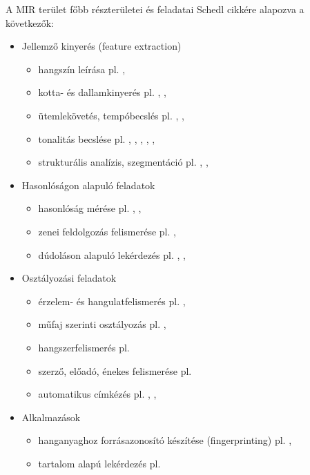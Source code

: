 A MIR terület főbb részterületei és feladatai Schedl \cite{Schedl2014} cikkére alapozva a következők:

\begin{itemize}
\item Jellemző kinyerés (feature extraction)
	\begin{itemize}
	\item hangszín leírása pl. \cite{hangszin1}, \cite{hangszin2}
	\item kotta- és dallamkinyerés pl. \cite{kotta1}, \cite{kotta2}, \cite{kotta3}
	\item ütemlekövetés, tempóbecslés pl. \cite{tempo1}, \cite{tempo2}, \cite{tempo3}
	\item tonalitás becslése pl. \cite{tonality1}, \cite{tonality2}, \cite{tonality3}, \cite{tonality4}, \cite{tonality5}, \cite{tonality6}
	\item strukturális analízis, szegmentáció pl. \cite{structural1}, \cite{structural2}, \cite{structural3}
	\end{itemize}
\item Hasonlóságon alapuló feladatok
	\begin{itemize}
	\item hasonlóság mérése pl. \cite{similarity1}, \cite{similarity2}, \cite{similarity3}
	\item zenei feldolgozás felismerése pl. \cite{cover1}, \cite{cover2}
	\item dúdoláson alapuló lekérdezés pl. \cite{humming1}, \cite{humming2}, \cite{humming3}
	\end{itemize}
\item Osztályozási feladatok
	\begin{itemize}
	\item érzelem- és hangulatfelismerés pl. \cite{mood1}, \cite{mood2}
	\item műfaj szerinti osztályozás pl. \cite{genre1}, \cite{genre2}
	\item hangszerfelismerés pl. \cite{instrument1}
	\item szerző, előadó, énekes felismerése pl. \cite{singer1}
	\item automatikus címkézés pl. \cite{tagging1}, \cite{tagging2}, \cite{tagging3}
	\end{itemize}
\item Alkalmazások
	\begin{itemize}
	\item hanganyaghoz forrásazonosító készítése (fingerprinting) pl. \cite{fingerprint1}, \cite{fingerprint2}
	\item tartalom alapú lekérdezés pl. \cite{contentbased1}

\end{itemize}
\end{itemize}
